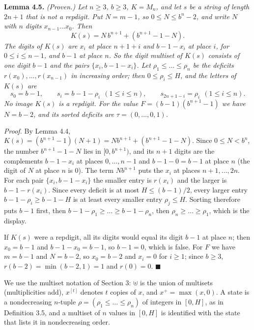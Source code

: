 \documentclass[11pt,letterpaper]{article}
\theoremstyle{paperstyle}
\theoremstyle{paperstyledef}
\theoremstyle{paperstylerem}
\begin{document}
\textbf{Lemma 4.5.} \emph{(Proven.) Let \(n \geq 3\), \(b \geq 3\), \(K = M_n\), and let \(s\) be a string of length \(2n+1\) that is not a repdigit. Put \(N = m - 1\), so \(0 \leq N \leq b^n - 2\), and write \(N\) with \(n\) digits \(x_{n-1} \dots x_0\). Then} \[K(s) = N\, b^{n+1} + (b^{n+1} - 1 - N).\] \emph{The digits of \(K(s)\) are \(x_i\) at place \(n+1+i\) and \(b-1-x_i\) at place \(i\), for \(0 \leq i \leq n-1\), and \(b-1\) at place \(n\). So the digit multiset of \(K(s)\) consists of one digit \(b-1\) and the pairs \(\{x_i, b-1-x_i\}\). Let \(\rho_1 \leq \dots \leq \rho_n\) be the deficits \(r(x_0), \dots, r(x_{n-1})\) in increasing order; then \(0 \leq \rho_i \leq H\), and the letters of \(K(s)\) are} \[s_0 = b-1, \qquad s_i = b-1-\rho_i \ \ (1 \leq i \leq n), \qquad s_{2n+1-i} = \rho_i \ \ (1 \leq i \leq n).\] \emph{No image \(K(s)\) is a repdigit. For the value \(F = (b-1)(b^{n+1} - 1)\) we have \(N = b-2\), and its sorted deficits are \(\tau = (0, \dots, 0, 1)\).}

\emph{Proof.} By Lemma 4.4, \(K(s) = (b^{n+1} - 1)(N+1) = N b^{n+1} + (b^{n+1} - 1 - N)\). Since \(0 \leq N < b^n\), the number \(b^{n+1} - 1 - N\) lies in \([0, b^{n+1})\), and its \(n+1\) digits are the complements \(b-1-x_i\) at places \(0, \dots, n-1\) and \(b-1-0 = b-1\) at place \(n\) (the digit of \(N\) at place \(n\) is \(0\)). The term \(N b^{n+1}\) puts the \(x_i\) at places \(n+1, \dots, 2n\). For each pair \(\{x_i, b-1-x_i\}\) the smaller entry is \(r(x_i)\) and the larger is \(b-1-r(x_i)\). Since every deficit is at most \(H \leq (b-1)/2\), every larger entry \(b-1-\rho_i \geq b-1-H\) is at least every smaller entry \(\rho_j \leq H\). Sorting therefore puts \(b-1\) first, then \(b-1-\rho_1 \geq \dots \geq b-1-\rho_n\), then \(\rho_n \geq \dots \geq \rho_1\), which is the display.

If \(K(s)\) were a repdigit, all its digits would equal its digit \(b-1\) at place \(n\); then \(x_0 = b-1\) and \(b-1-x_0 = b-1\), so \(b-1 = 0\), which is false. For \(F\) we have \(m = b-1\) and \(N = b-2\), so \(x_0 = b-2\) and \(x_i = 0\) for \(i \geq 1\); since \(b \geq 3\), \(r(b-2) = \min(b-2, 1) = 1\) and \(r(0) = 0\). \(\blacksquare\)

We use the multiset notation of Section 3: \(\uplus\) is the union of multisets (multiplicities add), \(x^{[t]}\) denotes \(t\) copies of \(x\), and \(x^+ = \max(x, 0)\). A state is a nondecreasing \(n\)-tuple \(\rho = (\rho_1 \leq \dots \leq \rho_n)\) of integers in \([0, H]\), as in Definition 3.5, and a multiset of \(n\) values in \([0, H]\) is identified with the state that lists it in nondecreasing order.
\end{document}
